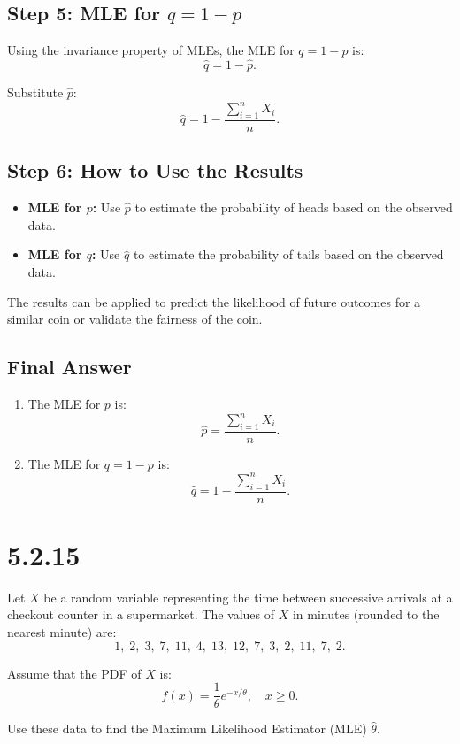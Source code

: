 \documentclass{article}
\begin{document}
\subsection*{Step 5: MLE for $q = 1 - p$}
Using the invariance property of MLEs, the MLE for $q = 1 - p$ is:
\[
\hat{q} = 1 - \hat{p}.
\]

Substitute $\hat{p}$:
\[
\hat{q} = 1 - \frac{\sum_{i=1}^n X_i}{n}.
\]

\subsection*{Step 6: How to Use the Results}
\begin{itemize}
    \item \textbf{MLE for $p$:} Use $\hat{p}$ to estimate the probability of heads based on the observed data.
    \item \textbf{MLE for $q$:} Use $\hat{q}$ to estimate the probability of tails based on the observed data.
\end{itemize}

The results can be applied to predict the likelihood of future outcomes for a similar coin or validate the fairness of the coin.

\subsection*{Final Answer}
\begin{enumerate}
    \item The MLE for $p$ is:
    \[
    \hat{p} = \frac{\sum_{i=1}^n X_i}{n}.
    \]
    \item The MLE for $q = 1 - p$ is:
    \[
    \hat{q} = 1 - \frac{\sum_{i=1}^n X_i}{n}.
    \]
\end{enumerate}


\section*{5.2.15}

Let $X$ be a random variable representing the time between successive arrivals at a checkout counter in a supermarket. The values of $X$ in minutes (rounded to the nearest minute) are:
\[
1, \; 2, \; 3, \; 7, \; 11, \; 4, \; 13, \; 12, \; 7, \; 3, \; 2, \; 11, \; 7, \; 2.
\]

Assume that the PDF of $X$ is:
\[
f(x) = \frac{1}{\theta} e^{-x / \theta}, \quad x \geq 0.
\]


Use these data to find the Maximum Likelihood Estimator (MLE) $\hat{\theta}$.
\end{document}
